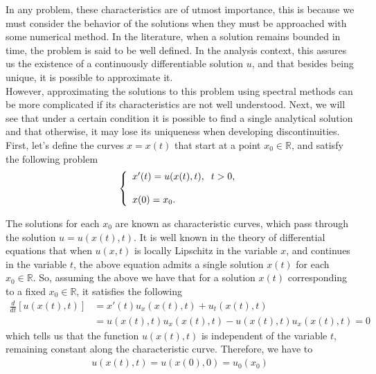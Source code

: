 	In any problem, these characteristics are of utmost importance, this is because we must consider the behavior of the solutions when they must be approached with some numerical method. In the literature, when a solution remains bounded in time, the problem is said to be well defined. In the analysis context, this assures us the existence of a continuously differentiable solution $u$, and that besides being unique, it is possible to approximate it. \\
	
	However, approximating the solutions to this problem using spectral methods can be more complicated if its characteristics are not well understood. Next, we will see that under a certain condition it is possible to find a single analytical solution and that otherwise, it may lose its uniqueness when developing discontinuities. \\
			
	First, let's define the curves $x = x(t)$ that start at a point $x_0 \in \mathbb{R}$, and satisfy the following problem
	\begin{align*}
		\left \lbrace \begin{array}{ll}
			x' (t) = u(x(t), t), \hspace{2mm} t > 0, \\
			\\
			x(0) = x_0.
		\end{array} \right .  
	\end{align*}
	
	The solutions for each $x_0$ are known as characteristic curves, which pass through the solution $u = u (x (t), t)$. It is well known in the theory of differential equations that when $u(x, t)$ is locally Lipschitz in the variable $x$, and continues in the variable $t$, the above equation admits a single solution $x(t)$ for each $x_0 \in \mathbb{R}$. So, assuming the above we have that for a solution $ x (t) $ corresponding to a fixed $x_0 \in \mathbb{R}$, it satisfies the following
	\begin{align*}
		\frac{d}{dt} [u(x(t), t)] &= x' (t) u_x (x(t), t) + u_t (x(t), t) \\
		&= u(x(t), t) u_x (x(t), t) - u(x(t), t) u_x (x(t), t) = 0
	\end{align*}
	which tells us that the function $u(x (t), t)$ is independent of the variable $t$, remaining constant along the characteristic curve. Therefore, we have to
	\begin{align*}
		u(x(t), t) = u (x(0), 0) = u_0 (x_0)
	\end{align*}
	
